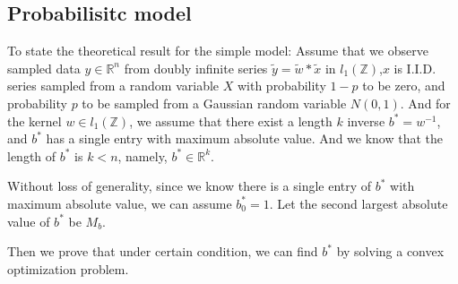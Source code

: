\documentclass[letter, 10pt]{article}
\numberwithin{equation}{section}
\begin{document}
\subsection{Probabilisitc model}
To state the theoretical result for the simple model:
Assume that we observe sampled data $y\in \mathbb{R}^n$ from doubly infinite series $\tilde y=\tilde w*\tilde x$ in $l_1( \mathbb{Z})$,$x$ is I.I.D. series sampled from a random variable $X$ with probability $1-p$ to be zero, and probability $p$ to be sampled from a Gaussian random variable $N(0,1)$. 
And for the kernel $w\in l_1( \mathbb{Z})$, we assume that there exist a length $k$ inverse $b^* = w^{-1}$, and $b^*$ has a single entry with maximum absolute value. And we know that the length of $b^*$ is  $k < n$, namely, $b^* \in \mathbb{R}^k$. 

Without loss of generality, since we know there is a single entry of $b^*$ with maximum absolute value, we can assume $b^*_0 =1$. Let the second largest absolute value of $b^*$ be $M_b$.

Then we prove that under certain condition, we can find $b^*$ by solving a convex optimization problem.
 
\end{document}
